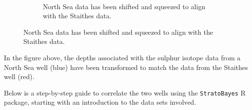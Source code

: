 \documentclass[
  letterpaper,
  DIV=11,
  numbers=noendperiod]{scrartcl}
\begin{document}
\begin{figure}
\begin{minipage}{0.48\linewidth}
\end{minipage}%
%
\begin{minipage}{0.04\linewidth}
~\end{minipage}%
%
\begin{minipage}{0.48\linewidth}

\begin{figure}[H]


\caption{\label{fig-3-2}North Sea data has been shifted and squeezed to
align with the Staithes data.}

\end{figure}%

\end{minipage}%

\end{figure}%

In the figure above, the depths associated with the sulphur isotope data
from a North Sea well (blue) have been transformed to match the data
from the Staithes well (red).

Below is a step-by-step guide to correlate the two wells using the
\texttt{StratoBayes} R package, starting with an introduction to the
data sets involved.
\end{document}

